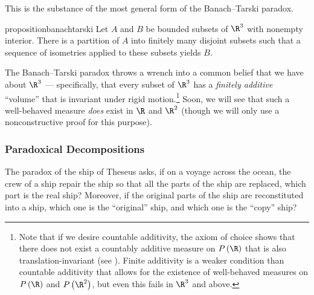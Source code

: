 \documentclass[10pt]{mypackage2}
\begin{document}
This is the substance of the most general form of the Banach--Tarski paradox.
\begin{restatable}{proposition}{banachtarski}\label{prop:banachtarski}
  Let $A$ and $B$ be bounded subsets of $\R^3$ with nonempty interior. There is a partition of $A$ into finitely many disjoint subsets such that a sequence of isometries applied to these subsets yields $B$.
\end{restatable}
The Banach--Tarski paradox throws a wrench into a common belief that we have about $\R^3$ --- specifically, that every subset of $\R^3$ has a \textit{finitely additive} ``volume'' that is invariant under rigid motion.\footnote{Note that if we desire countable additivity, the axiom of choice shows that there does not exist a countably additive measure on $P\left(\R\right)$ that is also translation-invariant (see \cite[Section 1.1]{folland_real_analysis}). Finite additivity is a weaker condition than countable additivity that allows for the existence of well-behaved measures on $P\left(\R\right)$ and $P\left(\R^2\right)$, but even this fails in $\R^3$ and above.} Soon, we will see that such a well-behaved measure \textit{does} exist in $\R$ and $\R^2$ (though we will only use a nonconstructive proof for this purpose).
\subsubsection{Paradoxical Decompositions}%
The paradox of the ship of Theseus asks, if on a voyage across the ocean, the crew of a ship repair the ship so that all the parts of the ship are replaced, which part is the real ship? Moreover, if the original parts of the ship are reconstituted into a ship, which one is the ``original'' ship, and which one is the ``copy'' ship?\newline
\end{document}
